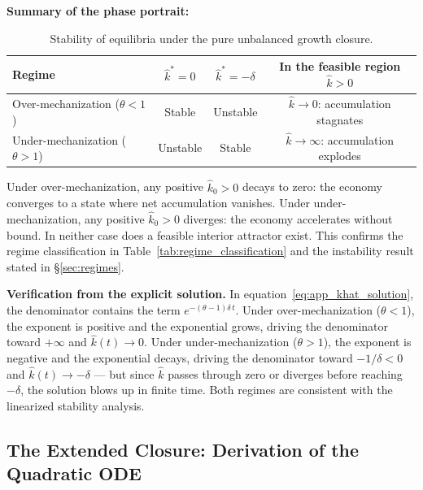 \documentclass[11pt,a4paper]{article}
\begin{document}
\textbf{Summary of the phase portrait:}

\begin{table}[H]
	\centering
	\begin{tabular}{lccc}
		\toprule
		\textbf{Regime} & $\hat{k}^* = 0$ & $\hat{k}^* = -\delta$ & \textbf{In the feasible region $\hat{k} > 0$} \\
		\midrule
		Over-mechanization ($\theta < 1$) & Stable & Unstable & $\hat{k} \to 0$: accumulation stagnates \\
		Under-mechanization ($\theta > 1$) & Unstable & Stable & $\hat{k} \to \infty$: accumulation explodes \\
		\bottomrule
	\end{tabular}
	\caption{Stability of equilibria under the pure unbalanced growth closure.}
	\label{tab:app_stability}
\end{table}

Under over-mechanization, any positive $\hat{k}_0 > 0$ decays to zero: the economy converges to a state where net accumulation vanishes. Under under-mechanization, any positive $\hat{k}_0 > 0$ diverges: the economy accelerates without bound. In neither case does a feasible interior attractor exist. This confirms the regime classification in Table~\ref{tab:regime_classification} and the instability result stated in \S\ref{sec:regimes}.

\textbf{Verification from the explicit solution.} In equation~\eqref{eq:app_khat_solution}, the denominator contains the term $e^{-(\theta-1)\delta\,t}$. Under over-mechanization ($\theta < 1$), the exponent is positive and the exponential grows, driving the denominator toward $+\infty$ and $\hat{k}(t) \to 0$. Under under-mechanization ($\theta > 1$), the exponent is negative and the exponential decays, driving the denominator toward $-1/\delta < 0$ and $\hat{k}(t) \to -\delta$ — but since $\hat{k}$ passes through zero or diverges before reaching $-\delta$, the solution blows up in finite time. Both regimes are consistent with the linearized stability analysis.


\subsection{The Extended Closure: Derivation of the Quadratic ODE}
\label{app:extended_derivation}
\end{document}
